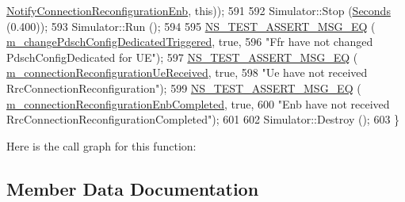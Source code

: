 \begin{DoxyCode}
      \hyperlink{lte-test-downlink-power-control_8cc_aa2299ae5ebf8dfb41cdfb7a62ac7b7bd}{NotifyConnectionReconfigurationEnb}, \textcolor{keyword}{this}));
591 
592   Simulator::Stop (\hyperlink{group__timecivil_ga33c34b816f8ff6628e33d5c8e9713b9e}{Seconds} (0.400));
593   Simulator::Run ();
594 
595   \hyperlink{group__testing_ga2a9d78cffb3db8e867c35fff0b698cf5}{NS\_TEST\_ASSERT\_MSG\_EQ} (
      \hyperlink{classLteDownlinkPowerControlRrcConnectionReconfigurationTestCase_a9db779c89ff70ec28f38d878cfcaff1a}{m\_changePdschConfigDedicatedTriggered}, \textcolor{keyword}{true},
596                          \textcolor{stringliteral}{"Ffr have not changed PdschConfigDedicated for UE"});
597   \hyperlink{group__testing_ga2a9d78cffb3db8e867c35fff0b698cf5}{NS\_TEST\_ASSERT\_MSG\_EQ} (
      \hyperlink{classLteDownlinkPowerControlRrcConnectionReconfigurationTestCase_aa440780c8ea103c1e12b13b27fb0fef8}{m\_connectionReconfigurationUeReceived}, \textcolor{keyword}{true},
598                          \textcolor{stringliteral}{"Ue have not received RrcConnectionReconfiguration"});
599   \hyperlink{group__testing_ga2a9d78cffb3db8e867c35fff0b698cf5}{NS\_TEST\_ASSERT\_MSG\_EQ} (
      \hyperlink{classLteDownlinkPowerControlRrcConnectionReconfigurationTestCase_adeee87fb6c59598467eac1d09a75feaa}{m\_connectionReconfigurationEnbCompleted}, \textcolor{keyword}{true},
600                          \textcolor{stringliteral}{"Enb have not received RrcConnectionReconfigurationCompleted"});
601 
602   Simulator::Destroy ();
603 \}
\end{DoxyCode}


Here is the call graph for this function\+:




\subsection{Member Data Documentation}

